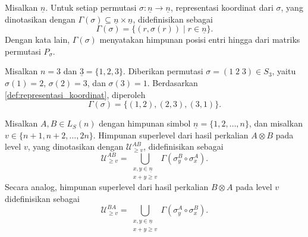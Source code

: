 \begin{definisi}\label{def:representasi_koordinat}
  Misalkan $\underline{n}$. Untuk setiap permutasi $\sigma:\underline{n}\to \underline{n}$, representasi koordinat dari $\sigma$, yang dinotasikan dengan $\Gamma(\sigma)\subseteq \underline{n}\times \underline{n}$, didefinisikan sebagai
  \[
    \Gamma(\sigma)
    =
    \{(r,\sigma(r))\mid r\in \underline{n}\}.
  \]
  Dengan kata lain, $\Gamma(\sigma)$ menyatakan himpunan posisi entri hingga dari matriks permutasi $P_\sigma$.
\end{definisi}

\begin{contoh}
  Misalkan $n=3$ dan $\underline{3}=\{1,2,3\}$. Diberikan permutasi $\sigma=(1\;2\;3)\in S_3$, yaitu $\sigma(1)=2$, $\sigma(2)=3$, dan $\sigma(3)=1$. Berdasarkan \autoref{def:representasi_koordinat}, diperoleh
  \[
    \Gamma(\sigma)=\{(1,2),(2,3),(3,1)\}.
  \]
\end{contoh}

\begin{definisi}\label{def:himpunan_superlevel}
  Misalkan $A,B\in L_S(n)$ dengan himpunan simbol $\underline{n}=\{1,2,\ldots,n\}$, dan misalkan $v\in\{n+1,n+2,\ldots,2n\}$. Himpunan superlevel dari hasil perkalian $A\otimes B$ pada level $v$, yang dinotasikan dengan $\mathcal{U}_{\ge v}^{AB}$, didefinisikan sebagai
  \[
    \mathcal{U}_{\ge v}^{AB}
    =
    \bigcup_{\substack{x,y\in \underline{n}\\x+y\ge v}}
    \Gamma(\sigma_y^B\circ\sigma_x^A).
  \]
  Secara analog, himpunan superlevel dari hasil perkalian $B\otimes A$ pada level $v$ didefinisikan sebagai
  \[
    \mathcal{U}_{\ge v}^{BA}
    =
    \bigcup_{\substack{x,y\in \underline{n}\\x+y\ge v}}
    \Gamma(\sigma_y^A\circ\sigma_x^B).
  \]
\end{definisi}

